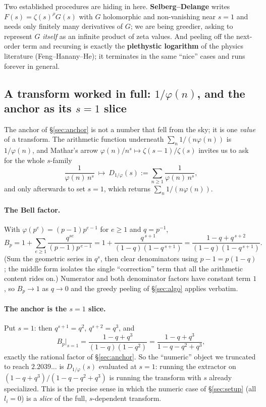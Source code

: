 \documentclass[11pt]{article}
\begin{document}
Two established procedures are hiding in here. \textbf{Selberg--Delange} writes
$F(s)=\zeta(s)^{\rho}G(s)$ with $G$ holomorphic and non-vanishing near $s=1$ and
needs only finitely many derivatives of $G$; we are being greedier, asking to
represent $G$ \emph{itself} as an infinite product of zeta values. And peeling off
the next-order term and recursing is exactly the \textbf{plethystic logarithm} of
the physics literature (Feng--Hanany--He); it terminates in the same ``nice'' cases
and runs forever in general.

\subsection{A transform worked in full: $1/\varphi(n)$, and the anchor as its $s=1$ slice}
\label{sec:transform-invphi}

The anchor of \S\ref{sec:anchor} is not a number that fell from the sky; it is one
\emph{value} of a transform. The arithmetic function underneath $\sum_n1/(n\varphi(n))$
is $1/\varphi(n)$, and Mathar's arrow $\varphi(n)/n^s\mapsto\zeta(s-1)/\zeta(s)$ invites
us to ask for the whole $s$-family
\[
\frac{1}{\varphi(n)\,n^{s}}\ \longmapsto\
D_{1/\varphi}(s):=\sum_{n\ge1}\frac{1}{\varphi(n)\,n^{s}},
\]
and only afterwards to set $s=1$, which returns $\sum_n1/(n\varphi(n))$.

\paragraph{The Bell factor.} With $\varphi(p^e)=(p-1)p^{e-1}$ for $e\ge1$ and $q=p^{-1}$,
\begin{equation}
\label{eq:invphi-bell}
B_p=1+\sum_{e\ge1}\frac{q^{se}}{(p-1)p^{\,e-1}}
   =1+\frac{q^{\,s+1}}{(1-q)(1-q^{\,s+1})}
   =\frac{1-q+q^{\,s+2}}{(1-q)(1-q^{\,s+1})}.
\end{equation}
(Sum the geometric series in $q^{s}$, then clear denominators using $p-1=p(1-q)$; the
middle form isolates the single ``correction'' term that all the arithmetic content
rides on.) Numerator and both denominator factors have constant term $1$, so
$B_p\to1$ as $q\to0$ and the greedy peeling of \S\ref{sec:algo} applies verbatim.

\paragraph{The anchor is the $s=1$ slice.} Put $s=1$: then $q^{s+1}=q^{2}$,
$q^{s+2}=q^{3}$, and
\[
B_p\big|_{s=1}=\frac{1-q+q^{3}}{(1-q)(1-q^{2})}=\frac{1-q+q^{3}}{1-q-q^{2}+q^{3}},
\]
exactly the rational factor of \S\ref{sec:anchor}. So the ``numeric'' object we
truncated to reach $2.2039\ldots$ is $D_{1/\varphi}(s)$ evaluated at $s=1$: running the
extractor on $(1-q+q^{3})/(1-q-q^{2}+q^{3})$ is running the transform with $s$ already
specialized. This is the precise sense in which the numeric case of \S\ref{sec:setup}
(all $l_i=0$) is a \emph{slice} of the full, $s$-dependent transform.
\end{document}
